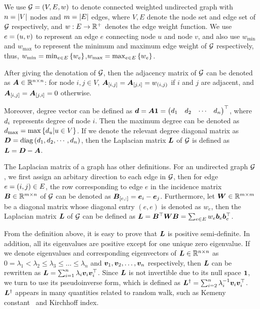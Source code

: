 \documentclass[sigconf]{acmart}
\begin{document}
We use \(\mathcal{G}=(V,E,w)\) to denote connected weighted undirected graph with \(n=\left|V \right|\) nodes and \(m=\left|E \right|\) edges, where \(V,E\) denote the node set and edge set of \(\mathcal{G}\) respectively, and \(w:E\to\mathbb{R}^+\) denotes the edge weight function.
We use \(e=\left( u,v \right)\) to represent an edge \(e\) connecting node \(u\) and node \(v\), and also use \(w_{\min}\) and \(w_{\max}\) to represent the minimum and maximum edge weight of \(\mathcal{G}\) respectively, thus, \(w_{\min}=\min_{e\in E}\left\{w_e \right\}\),\(w_{\max}=\max_{e\in E}\left\{w_e \right\}\).

After giving the denotation of \(\mathcal{G}\), then the adjacency matrix of \(\mathcal{G}\) can be denoted as \(\boldsymbol{A}\in \mathbb{R}^{n\times n}\): for node \(i,j\in V\), \(\boldsymbol{A}_{[i,j]}=\boldsymbol{A}_{[j,i]}=w_{\left( i,j \right)}\) if \(i\) and \(j\) are adjacent, and \(\boldsymbol{A}_{[i,j]}=\boldsymbol{A}_{[j,i]}=0\) otherwise.

Moreover, degree vector can be defined as \(\boldsymbol{d}=\boldsymbol{A}\boldsymbol{1}=\begin{pmatrix}d_1&d_2&\cdots&d_n\end{pmatrix}^\top\), where \(d_i\) represents degree of node \(i\).
Then the maximum degree can be denoted as \(d_{\max}=\max\left\{d_u|u\in V \right\}\).
If we denote the relevant degree diagonal matrix as \(\boldsymbol{D}={\rm{diag}}\left( d_1,d_2,\cdots,d_n \right)\), then the Laplacian matrix \(\boldsymbol{L}\) of \(\mathcal{G}\) is defined as \(\boldsymbol{L}=\boldsymbol{D}-\boldsymbol{A}\).

The Laplacian matrix of a graph has other definitions.
For an undirected graph \(\mathcal{G}\), we first assign an arbitary direction to each edge in \(\mathcal{G}\), then for edge \(e=\left( i,j \right)\in E\), the row corresponding to edge \(e\) in the incidence matrix \(\boldsymbol{B}\in\mathbb{R}^{m\times n}\) of \(\mathcal{G}\) can be denoted as \(\boldsymbol{B}_{[e,:]}=\boldsymbol{e}_i-\boldsymbol{e}_j\).
Furthermore, let \(\boldsymbol{W}\in\mathbb{R}^{m\times m}\) be a diagonal matrix whose diagonal entry \((e,e)\) is denoted as \(w_e\), then the Laplacian matrix \(\boldsymbol{L}\) of \(\mathcal{G}\) can be defined as \(\boldsymbol{L}=\boldsymbol{B}^\top\boldsymbol{W}\boldsymbol{B}=\sum_{e\in E}w_e\boldsymbol{b}_e\boldsymbol{b}_e^\top\).

From the definition above, it is easy to prove that \(\boldsymbol{L}\) is positive semi-definite.
In addition, all its eigenvalues are positive except for one unique zero eigenvalue.
If we denote eigenvalues and corresponding eigenvectors of \(\boldsymbol{L}\in\mathbb{R}^{n\times n}\) as \(0=\lambda_1<\lambda_2\le\lambda_3\le\dots\le\lambda_n\) and \(\boldsymbol{v}_1,\boldsymbol{v}_2,\dots,\boldsymbol{v}_n\) respectively, then \(\boldsymbol{L}\) can be rewritten as \(\boldsymbol{L}=\sum_{i=1}^n\lambda_i\boldsymbol{v}_i\boldsymbol{v}_i^\top\).
Since \(\boldsymbol{L}\) is not invertible due to its null space \(\boldsymbol{1}\), we turn to use its pseudoinverse form, which is defined as \(\boldsymbol{L}^\dagger=\sum_{i=2}^n\lambda_i^{-1}\boldsymbol{v}_i\boldsymbol{v}_i^\top\).
\(\boldsymbol{L}^\dagger\) appears in many quantities related to random walk, such as Kemeny constant~\cite{Hu14} and Kirchhoff index.
\end{document}
